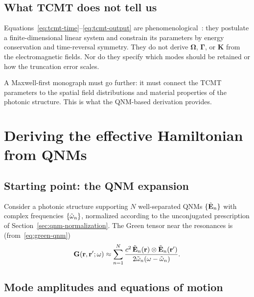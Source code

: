 \subsection{What TCMT does not tell us}
\label{ssec:tcmt-limitations}

Equations~\eqref{eq:tcmt-time}--\eqref{eq:tcmt-output} are
phenomenological~\cite{icon2022imaginary,alpeggiani2017quasinormal,opg2021non}: they postulate a finite-dimensional linear system and
constrain its parameters by energy conservation and time-reversal
symmetry. They do not derive $\boldsymbol{\Omega}$,
$\boldsymbol{\Gamma}$, or $\mathbf{K}$ from the electromagnetic fields.
Nor do they specify which modes should be retained or how the truncation
error scales.

A Maxwell-first monograph must go further: it must connect the TCMT
parameters to the spatial field distributions and material properties of
the photonic structure. This is what the QNM-based derivation provides.


\section{Deriving the effective Hamiltonian from QNMs}
\label{sec:heff-derivation}

\subsection{Starting point: the QNM expansion}
\label{ssec:qnm-start}

Consider a photonic structure supporting $N$ well-separated QNMs
$\{\tilde{\mathbf{E}}_n\}$ with complex frequencies $\{\tilde{\omega}_n\}$, normalized
according to the unconjugated prescription of
Section~\ref{sec:qnm-normalization}. The Green tensor near the
resonances is (from~\eqref{eq:green-qnm})
\begin{equation}
 \mathbf{G}(\mathbf{r},\mathbf{r}';\omega)
 \approx \sum_{n=1}^{N}
 \frac{c^2\,\tilde{\mathbf{E}}_n(\mathbf{r})\otimes\tilde{\mathbf{E}}_n(\mathbf{r}')}
 {2\tilde{\omega}_n(\omega - \tilde{\omega}_n)}.
 \label{eq:green-few-mode}
\end{equation}

\subsection{Mode amplitudes and equations of motion}
\label{ssec:mode-amplitudes}

